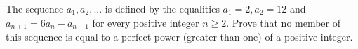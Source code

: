 The sequence $a_1, a_2,...$ is defined by the equalities $a_1 = 2, a_2 = 12$ and $a_{n+1} = 6a_n-a_{n-1}$ for every positive integer $n \ge  2$. Prove that no member of this sequence is equal to a perfect power (greater than one) of a positive integer.